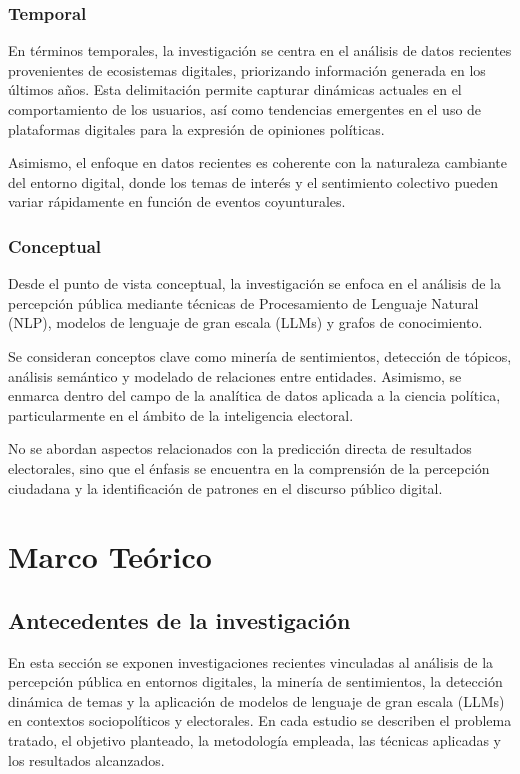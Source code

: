 \documentclass[listof=nochaptergap,12pt,times,authoryear]{report}
\begin{document}
\subsection{Temporal}

En términos temporales, la investigación se centra en el análisis de datos recientes provenientes de ecosistemas digitales, priorizando información generada en los últimos años. Esta delimitación permite capturar dinámicas actuales en el comportamiento de los usuarios, así como tendencias emergentes en el uso de plataformas digitales para la expresión de opiniones políticas.

Asimismo, el enfoque en datos recientes es coherente con la naturaleza cambiante del entorno digital, donde los temas de interés y el sentimiento colectivo pueden variar rápidamente en función de eventos coyunturales.

\subsection{Conceptual}

Desde el punto de vista conceptual, la investigación se enfoca en el análisis de la percepción pública mediante técnicas de Procesamiento de Lenguaje Natural (NLP), modelos de lenguaje de gran escala (LLMs) y grafos de conocimiento.

Se consideran conceptos clave como minería de sentimientos, detección de tópicos, análisis semántico y modelado de relaciones entre entidades. Asimismo, se enmarca dentro del campo de la analítica de datos aplicada a la ciencia política, particularmente en el ámbito de la inteligencia electoral.

No se abordan aspectos relacionados con la predicción directa de resultados electorales, sino que el énfasis se encuentra en la comprensión de la percepción ciudadana y la identificación de patrones en el discurso público digital.
\chapter{Marco Teórico}
\section{Antecedentes de la investigación}
En esta sección se exponen investigaciones recientes vinculadas al análisis de la percepción pública en entornos digitales, la minería de sentimientos, la detección dinámica de temas y la aplicación de modelos de lenguaje de gran escala (LLMs) en contextos sociopolíticos y electorales. En cada estudio se describen el problema tratado, el objetivo planteado, la metodología empleada, las técnicas aplicadas y los resultados alcanzados.
\end{document}
